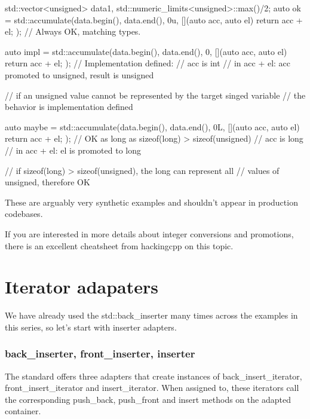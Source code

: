 \begin{box-note}
\begin{cppcode}
std::vector<unsigned> data{1, std::numeric_limits<unsigned>::max()/2};
auto ok = std::accumulate(data.begin(), data.end(), 0u, 
                          [](auto acc, auto el) { return acc + el; });
// Always OK, matching types.

auto impl = std::accumulate(data.begin(), data.end(), 0, 
                            [](auto acc, auto el) { return acc + el; });
// Implementation defined:
// acc is int
// in acc + el: acc promoted to unsigned, result is unsigned

// if an unsigned value cannot be represented by the target singed variable
// the behavior is implementation defined

auto maybe = std::accumulate(data.begin(), data.end(), 0L, 
                             [](auto acc, auto el) { return acc + el; });
// OK as long as sizeof(long) > sizeof(unsigned)
// acc is long
// in acc + el: el is promoted to long

// if sizeof(long) > sizeof(unsigned), the long can represent all 
// values of unsigned, therefore OK
\end{cppcode}
\end{box-note}

These are arguably very synthetic examples and shouldn’t appear in production codebases.

If you are interested in more details about integer conversions and promotions, there is an excellent cheatsheet from hackingcpp on this topic.

\section{Iterator adapaters}

We have already used the std::back\_inserter many times across the examples in this series, so let's start with inserter adapters.

\subsubsection{back\_inserter, front\_inserter, inserter}

The standard offers three adapters that create instances of back\_insert\_iterator, front\_insert\_iterator and insert\_iterator. When assigned to, these iterators call the corresponding push\_back, push\_front and insert methods on the adapted container.

